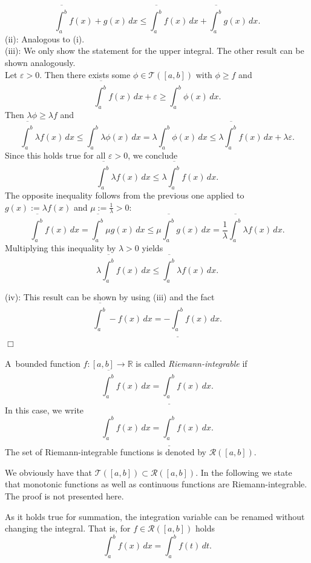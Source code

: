 \[\overline{\int_a^b}f(x)+g(x)\, dx\leq\overline{\int_a^b}f(x)\, dx+\overline{\int_a^b}g(x)\, dx.\]
(ii): Analogous to (i).\\
(iii):  We only show the statement for the upper integral. The other result can be shown analogously.\\
Let $\varepsilon>0$. Then there exists some $\phi\in\mathcal{T}([a,b])$ with $\phi\geq f$ and
\[\overline{\int_a^b}f(x)\, dx+\varepsilon\geq{\int_a^b}\phi(x)\, dx.\]
Then $\lambda \phi\geq\lambda f$ and
\[\overline{\int_a^b} \lambda f(x)\, dx\leq{\int_a^b}\lambda\phi(x)\, dx=\lambda{\int_a^b}\phi(x)\, dx\leq \lambda\overline{\int_a^b} f(x)\, dx+\lambda\varepsilon.\]
Since this holds true for all $\varepsilon>0$, we conclude
\[\overline{\int_a^b}\lambda f(x)\, dx\leq\lambda \overline{\int_a^b}f(x)\, dx.\]
The opposite inequality follows from the previous one applied to $g(x):=\lambda f(x)$ and $\mu:=\frac{1}{\lambda}>0$:
\[\overline{\int_a^b} f(x)\, dx =  \overline{\int_a^b} \mu g(x)\, dx \leq \mu \overline{\int_a^b}g(x)\, dx = \frac{1}{\lambda} \overline{\int_a^b}\lambda f(x)\, dx.\]
Multiplying this inequality by $\lambda>0$ yields
\[\lambda \overline{\int_a^b} f(x)\, dx  \leq \overline{\int_a^b}\lambda f(x)\, dx.\]

(iv): This result can be shown by using (iii) and the fact
\[\overline{\int_a^b}-f(x)\, dx=-\underline{\int_a^b}f(x)\, dx.\]
\hfill$\Box$

\begin{Definition}{}
A~bounded function $f:[a,b]\to\mathbb{R}$ is called \emph{Riemann-integrable} if
\[\overline{\int_a^b}f(x)\, dx=\underline{\int_a^b}f(x)\, dx.\]
In this case, we write
\[{\int_a^b}f(x)\, dx=\underline{\int_a^b}f(x)\, dx.\]
The set of Riemann-integrable functions is denoted by $\mathcal{R}([a,b])$.
\end{Definition}


We obviously have that $\mathcal{T}([a,b])\subset\mathcal{R}([a,b])$. In the following we state that monotonic functions as well as continuous functions are Riemann-integrable. The proof is not presented here.

\begin{Remark}{}
As it holds true for summation, the integration variable can be renamed without changing the integral. That is, for $f\in\mathcal{R}([a,b])$ holds
\[{\int_a^b}f(x)\, dx={\int_a^b}f(t)\, dt.\]
\end{Remark}


